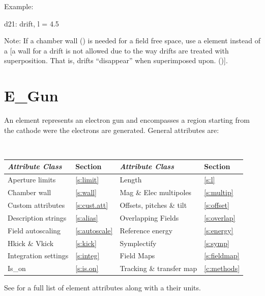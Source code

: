 Example:
\begin{example}
  d21: drift, l = 4.5
\end{example}

Note: If a chamber wall () is needed for a field free
space, use a  element instead of a  [a wall for a
drift is not allowed due to the way drifts are treated with
superposition. That is, drifts ``disappear'' when superimposed
upon. ()].

\newpage

\section{E_Gun}
\label{s:e.gun}

An  element represents an electron gun and encompasses a region starting from the cathode
were the electrons are generated.  General  attributes are:
\begin{center}
\tt
\begin{tabular}{llll} \toprule
  {\sl Attribute Class}      & Section           & {\sl Attribute Class}      & Section           \\ \midrule
  Aperture limits            & \ref{s:limit}     & Length                     & \ref{s:l}         \\
  Chamber wall               & \ref{s:wall}      & Mag \& Elec multipoles     & \ref{s:multip}    \\
  Custom attributes          & \ref{s:cust.att}  & Offsets, pitches \& tilt   & \ref{s:offset}    \\ 
  Description strings        & \ref{s:alias}     & Overlapping Fields         & \ref{s:overlap}   \\
  Field autoscaling          & \ref{s:autoscale} & Reference energy           & \ref{s:energy}    \\ 
  Hkick \& Vkick             & \ref{s:kick}      & Symplectify                & \ref{s:symp}      \\
  Integration settings       & \ref{s:integ}     & Field Maps                 & \ref{s:fieldmap}  \\
  Is_on                      & \ref{s:is.on}     & Tracking \& transfer map   & \ref{c:methods}   \\ 
  \bottomrule
\end{tabular}
\end{center}
\toffset
See  for a full list of element attributes along with a their units.

